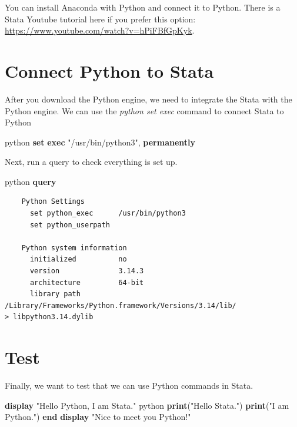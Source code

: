 \documentclass[
]{book}
\newenvironment{Shaded}{\begin{snugshade}}{\end{snugshade}}
\newcommand{\KeywordTok}[1]{\textcolor[rgb]{0.13,0.29,0.53}{\textbf{#1}}}
\newcommand{\NormalTok}[1]{#1}
\newcommand{\StringTok}[1]{\textcolor[rgb]{0.31,0.60,0.02}{#1}}
\begin{document}
You can install Anaconda with Python and connect it to Python. There is a Stata Youtube tutorial here if you prefer this option: \url{https://www.youtube.com/watch?v=hPiFBfGpKyk}.

\section{Connect Python to Stata}\label{connect-python-to-stata}

After you download the Python engine, we need to integrate the Stata with the Python engine. We can use the \emph{python set exec} command to connect Stata to Python

\begin{Shaded}
\begin{Highlighting}[]
\NormalTok{python }\KeywordTok{set} \KeywordTok{exec} \StringTok{"/usr/bin/python3"}\NormalTok{, }\KeywordTok{permanently}
\end{Highlighting}
\end{Shaded}

Next, run a query to check everything is set up.

\begin{Shaded}
\begin{Highlighting}[]
\NormalTok{python }\KeywordTok{query}
\end{Highlighting}
\end{Shaded}

\begin{verbatim}
    Python Settings
      set python_exec      /usr/bin/python3
      set python_userpath  

    Python system information
      initialized          no
      version              3.14.3
      architecture         64-bit
      library path         /Library/Frameworks/Python.framework/Versions/3.14/lib/
> libpython3.14.dylib
\end{verbatim}

\section{Test}\label{test}

Finally, we want to test that we can use Python commands in Stata.

\begin{Shaded}
\begin{Highlighting}[]
\KeywordTok{display} \StringTok{"Hello Python, I am Stata."}
\NormalTok{python}
\KeywordTok{print}\NormalTok{(}\StringTok{"Hello Stata."}\NormalTok{)}
\KeywordTok{print}\NormalTok{(}\StringTok{"I am Python."}\NormalTok{)}
\KeywordTok{end}
\KeywordTok{display} \StringTok{"Nice to meet you Python!"}
\end{Highlighting}
\end{Shaded}
\end{document}
